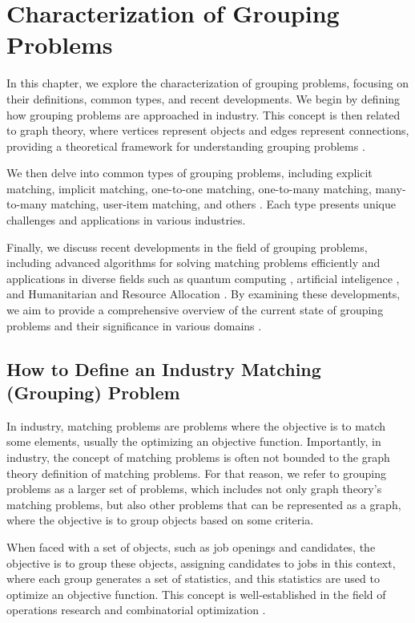 \chapter{Characterization of Grouping Problems} \label{chap:grouping_problems} 

    In this chapter, we explore the characterization of grouping problems, focusing on their definitions, common types, and recent developments. We begin by defining how grouping problems are approached in industry. This concept is then related to graph theory, where vertices represent objects and edges represent connections, providing a theoretical framework for understanding grouping problems \cite{newman2018networks}.
    
    We then delve into common types of grouping problems, including explicit matching, implicit matching, one-to-one matching, one-to-many matching, many-to-many matching, user-item matching, and others \cite{gusfield1989stable, demange1986multi}. Each type presents unique challenges and applications in various industries.
    
    Finally, we discuss recent developments in the field of grouping problems, including advanced algorithms for solving matching problems efficiently and applications in diverse fields such as quantum computing \cite{quantum_matching}, artificial inteligence \cite{gnn_graph_matching, cross_modal_matching}, and Humanitarian and Resource Allocation \cite{humanitarian_routing}. By examining these developments, we aim to provide a comprehensive overview of the current state of grouping problems and their significance in various domains \cite{ieee_survey}.
    
\section{How to Define an Industry Matching (Grouping) Problem}

    In industry, matching problems are problems where the objective is to match some elements, usually the optimizing an objective function.
    Importantly, in industry, the concept of matching problems is often not bounded to the graph theory definition of matching problems.
    For that reason, we refer to grouping problems as a larger set of problems, which includes not only graph theory's matching problems, but also other problems that can be represented as a graph, where the objective is to group objects based on some criteria.

    When faced with a set of objects, such as job openings and candidates, the objective is to group these objects, assigning candidates to jobs in this context, where each group generates a set of statistics, and this statistics are used to optimize an objective function. This concept is well-established in the field of operations research and combinatorial optimization \cite{manlove2013algorithmics}.

